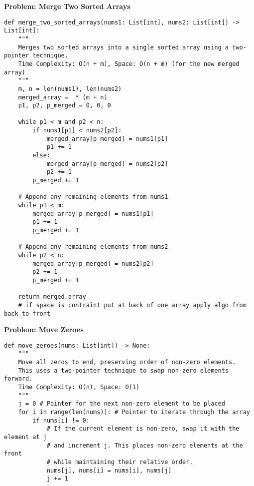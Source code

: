 \noindent\textbf{Problem: Merge Two Sorted Arrays}
\begin{verbatim}
def merge_two_sorted_arrays(nums1: List[int], nums2: List[int]) -> List[int]:
    """
    Merges two sorted arrays into a single sorted array using a two-pointer technique.
    Time Complexity: O(n + m), Space: O(n + m) (for the new merged array)
    """
    m, n = len(nums1), len(nums2)
    merged_array =  * (m + n)
    p1, p2, p_merged = 0, 0, 0

    while p1 < m and p2 < n:
        if nums1[p1] < nums2[p2]:
            merged_array[p_merged] = nums1[p1]
            p1 += 1
        else:
            merged_array[p_merged] = nums2[p2]
            p2 += 1
        p_merged += 1
    
    # Append any remaining elements from nums1
    while p1 < m:
        merged_array[p_merged] = nums1[p1]
        p1 += 1
        p_merged += 1
    
    # Append any remaining elements from nums2
    while p2 < n:
        merged_array[p_merged] = nums2[p2]
        p2 += 1
        p_merged += 1
    
    return merged_array
    # if space is contraint put at back of one array apply algo from back to front
\end{verbatim}

\noindent\textbf{Problem: Move Zeroes}
\begin{verbatim}
def move_zeroes(nums: List[int]) -> None:
    """
    Move all zeros to end, preserving order of non-zero elements.
    This uses a two-pointer technique to swap non-zero elements forward.
    Time Complexity: O(n), Space: O(1)
    """
    j = 0 # Pointer for the next non-zero element to be placed
    for i in range(len(nums)): # Pointer to iterate through the array
        if nums[i] != 0:
            # If the current element is non-zero, swap it with the element at j
            # and increment j. This places non-zero elements at the front
            # while maintaining their relative order.
            nums[j], nums[i] = nums[i], nums[j]
            j += 1
\end{verbatim}

